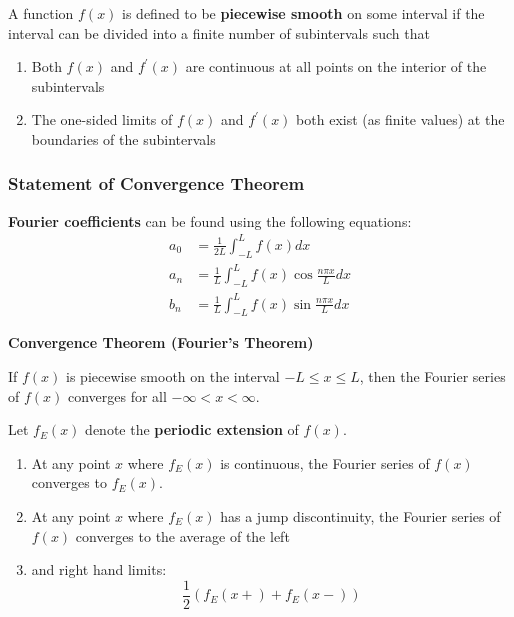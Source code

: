 \documentclass{article}
\begin{document}
\begin{definition}
    A function \(f(x)\) is defined to be \textbf{piecewise smooth} on some interval if the interval 
    can be divided into a finite number of subintervals such that
    \begin{enumerate}
        \item Both \(f(x)\) and \(f^{\prime} (x)\) are continuous at all points on the interior of the subintervals 
        \item The one-sided limits of \(f(x)\) and \(f^{\prime} (x)\) both exist (as finite values) at the boundaries of the subintervals
    \end{enumerate}     
\end{definition}

\subsubsection{Statement of Convergence Theorem}
\textbf{Fourier coefficients} can be found using the following equations:
\begin{align*}
    a_0&=\frac{1}{2L}\int_{-L}^{L}f(x)dx \\
    a_n&=\frac{1}{L}\int_{-L}^{L}f(x)\cos \frac{n \pi x}{L}dx \\
    b_n&=\frac{1}{L}\int_{-L}^L f(x)\sin \frac{n \pi x}{L}dx
\end{align*}

\begin{theorem}{\textbf{Convergence Theorem (Fourier's Theorem)}}
    $ $
   
    If \(f(x)\) is piecewise smooth on the interval \(-L\leq x \leq L\), then the Fourier series of \(f(x)\) 
    converges for all \(-\infty <x<\infty \).
    
    Let \(f_E(x)\) denote the \textbf{periodic extension} of \(f(x)\).
    \begin{enumerate}
        \item At any point \(x\) where \(f_E(x)\) is continuous, the Fourier series of \(f(x)\) converges to \(f_E(x)\). 
        \item At any point \(x\) where \(f_E(x)\) has a jump discontinuity, the Fourier series of \(f(x)\) converges to the average of the left 
        \item and right hand limits:
        \[
            \frac{1}{2}(f_E(x+)+f_E(x-))
        \]    
    \end{enumerate}
\end{theorem}
\end{document}

